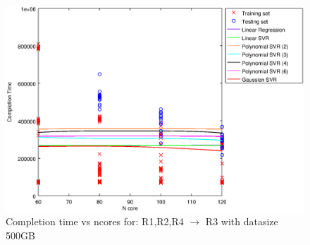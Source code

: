 
\begin {figure}[hbtp]
\centering
\includegraphics[width=\textwidth]{output/R1,R2,R4_R3_500_ALL_FEATURES/plot_R1,R2,R4_R3_500.eps}
\caption{Completion time vs ncores for: R1,R2,R4 $\rightarrow$ R3 with datasize 500GB}
\label{fig:coreonly_linear_R1,R2,R4_R3_500}
\end {figure}
